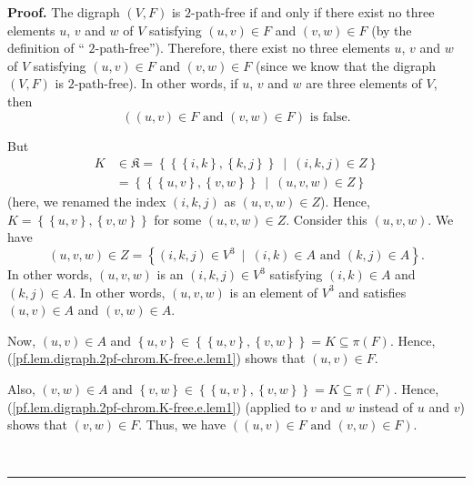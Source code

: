 \documentclass[numbers=enddot,12pt,final,onecolumn,notitlepage]{scrartcl}%
\theoremstyle{definition}
\newenvironment{proof}[1][Proof]{\noindent\textbf{#1.} }{\ \rule{0.5em}{0.5em}}
\newenvironment{verlong}{}{}
\begin{document}
\begin{verlong}
\begin{proof}
The digraph $\left(  V,F\right)  $ is $2$-path-free if and only if there exist
no three elements $u$, $v$ and $w$ of $V$ satisfying $\left(  u,v\right)  \in
F$ and $\left(  v,w\right)  \in F$ (by the definition of \textquotedblleft%
$2$-path-free\textquotedblright). Therefore, there exist no three elements
$u$, $v$ and $w$ of $V$ satisfying $\left(  u,v\right)  \in F$ and $\left(
v,w\right)  \in F$ (since we know that the digraph $\left(  V,F\right)  $ is
$2$-path-free). In other words, if $u$, $v$ and $w$ are three elements of $V$,
then%
\begin{equation}
\left(  \left(  u,v\right)  \in F\text{ and }\left(  v,w\right)  \in F\right)
\text{ is false.} \label{pf.lem.digraph.2pf-chrom.K-free.e.imp1.pf.2}%
\end{equation}


But%
\begin{align*}
K  &  \in\mathfrak{K}=\left\{  \left\{  \left\{  i,k\right\}  ,\left\{
k,j\right\}  \right\}  \ \mid\ \left(  i,k,j\right)  \in Z\right\} \\
&  =\left\{  \left\{  \left\{  u,v\right\}  ,\left\{  v,w\right\}  \right\}
\ \mid\ \left(  u,v,w\right)  \in Z\right\}
\end{align*}
(here, we renamed the index $\left(  i,k,j\right)  $ as $\left(  u,v,w\right)
\in Z$). Hence, $K=\left\{  \left\{  u,v\right\}  ,\left\{  v,w\right\}
\right\}  $ for some $\left(  u,v,w\right)  \in Z$. Consider this $\left(
u,v,w\right)  $. We have%
\[
\left(  u,v,w\right)  \in Z=\left\{  \left(  i,k,j\right)  \in V^{3}%
\ \mid\ \left(  i,k\right)  \in A\text{ and }\left(  k,j\right)  \in
A\right\}  .
\]
In other words, $\left(  u,v,w\right)  $ is an $\left(  i,k,j\right)  \in
V^{3}$ satisfying $\left(  i,k\right)  \in A$ and $\left(  k,j\right)  \in A$.
In other words, $\left(  u,v,w\right)  $ is an element of $V^{3}$ and
satisfies $\left(  u,v\right)  \in A$ and $\left(  v,w\right)  \in A$.

Now, $\left(  u,v\right)  \in A$ and $\left\{  u,v\right\}  \in\left\{
\left\{  u,v\right\}  ,\left\{  v,w\right\}  \right\}  =K\subseteq\pi\left(
F\right)  $. Hence, (\ref{pf.lem.digraph.2pf-chrom.K-free.e.lem1}) shows that
$\left(  u,v\right)  \in F$.

Also, $\left(  v,w\right)  \in A$ and $\left\{  v,w\right\}  \in\left\{
\left\{  u,v\right\}  ,\left\{  v,w\right\}  \right\}  =K\subseteq\pi\left(
F\right)  $. Hence, (\ref{pf.lem.digraph.2pf-chrom.K-free.e.lem1}) (applied to
$v$ and $w$ instead of $u$ and $v$) shows that $\left(  v,w\right)  \in F$.
Thus, we have $\left(  \left(  u,v\right)  \in F\text{ and }\left(
v,w\right)  \in F\right)  $.


\end{proof}
\end{verlong}
\end{document}
